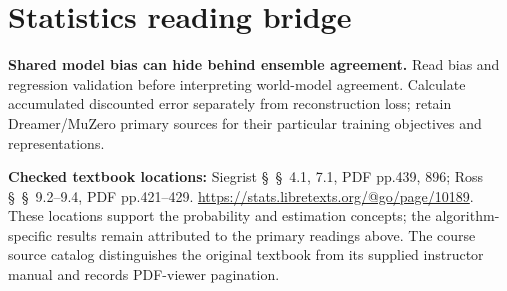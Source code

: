 \documentclass[11pt]{scrartcl}
\begin{document}
\section*{Statistics reading bridge}
\textbf{Shared model bias can hide behind ensemble agreement.} Read bias and regression validation before interpreting world-model agreement. Calculate accumulated discounted error separately from reconstruction loss; retain Dreamer/MuZero primary sources for their particular training objectives and representations.

\textbf{Checked textbook locations:} Siegrist \S~\S~4.1, 7.1, PDF pp.439, 896; Ross \S~\S~9.2--9.4, PDF pp.421--429. \url{https://stats.libretexts.org/@go/page/10189}. These locations support the probability and estimation concepts; the algorithm-specific results remain attributed to the primary readings above. The course source catalog distinguishes the original textbook from its supplied instructor manual and records PDF-viewer pagination.
\end{document}
